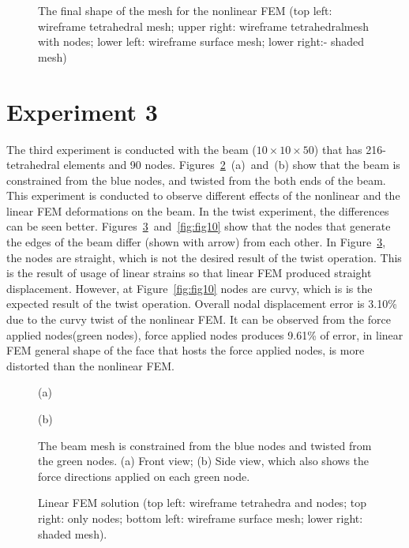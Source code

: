 \begin{figure}[h]
\centerline{}
\caption{The final shape of the mesh for the nonlinear FEM (top left: wireframe tetrahedral mesh; upper right: wireframe tetrahedralmesh with nodes; lower left: wireframe surface mesh; lower right:- shaded mesh)}
\label{fig:fig6}
\end{figure}

\clearpage
\section{Experiment 3}
\label{iii}

The third experiment is conducted with the beam ($10 \times 10 \times 50$) that has 216-tetrahedral elements and 90 nodes. Figures~\ref{fig:fig78}~(a)~and~(b) show that the beam is constrained from the blue nodes, and twisted from the both ends of the beam. This experiment is conducted to observe different effects of the nonlinear and the linear FEM deformations on the beam. In the twist experiment, the differences can be seen better. Figures~\ref{fig:fig9}~and~\ref{fig:fig10} show that the nodes that generate the edges of the beam differ (shown with arrow) from each other. In Figure~\ref{fig:fig9}, the nodes are straight, which is not the desired result of the twist operation. This is the result of usage of linear strains so that linear FEM produced straight displacement. However, at Figure~\ref{fig:fig10} nodes are curvy, which is is the expected result of the twist operation. Overall nodal displacement error is 3.10\% due to the curvy twist of the nonlinear FEM. It can be observed from the force applied nodes(green nodes), force applied nodes produces 9.61\% of error, in linear FEM general shape of the face that hosts the force applied nodes, is more distorted than the nonlinear FEM.

\begin{figure}[h]
\centerline{}
\centerline{(a)}
\centerline{}
\centerline{(b)}
\caption{The beam mesh is constrained from the blue nodes and twisted from the green nodes. (a) Front view; (b) Side view, which also shows the force directions applied on each green node.}
\label{fig:fig78}
\end{figure}

\begin{figure}[c]
\centerline{}
\caption{Linear FEM solution (top left: wireframe tetrahedra and nodes; top right: only nodes; bottom left: wireframe surface mesh; lower right: shaded mesh).}
\label{fig:fig9}
\end{figure}

